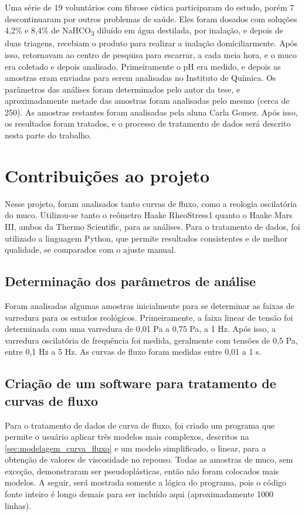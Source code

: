	Uma série de 19 voluntários com fibrose cística participaram do estudo, porém 7 descontinuaram por outros problemas de saúde. Eles foram dosados com soluções 4,2\% e 8,4\% de NaHCO\textsubscript{3} diluído em água destilada, por inalação, e depois de duas triagens, recebiam o produto para realizar a inalação domiciliarmente. Após isso, retornavam ao centro de pesquisa para escarrar, a cada meia hora, e o muco era coletado e depois analisado. Primeiramente o pH era medido, e depois as amostras eram enviadas para serem analisadas no Instituto de Química. Os parâmetros das análises foram determinados pelo autor da tese, e aproximadamente metade das amostras foram analisadas pelo mesmo (cerca de 250). As amostras restantes foram analisadas pela aluna Carla Gomez. Após isso, os resultados foram tratados, e o processo de tratamento de dados será descrito nesta parte do trabalho.


	\chapter{Contribuições ao projeto}
	
	Nesse projeto, foram analisados tanto curvas de fluxo, como a reologia oscilatória do muco. Utilizou-se tanto o reômetro Haake RheoStress1 quanto o Haake Mars III, ambos da Thermo Scientific, para as análises. Para o tratamento de dados, foi utilizado a linguagem Python, que permite resultados consistentes e de melhor qualidade, se comparados com o ajuste manual.
	
		\section{Determinação dos parâmetros de análise}
		
		Foram analisadas algumas amostras inicialmente para se determinar as faixas de varredura para os estudos reológicos. Primeiramente, a faixa linear de tensão foi determinada com uma varredura de 0,01 Pa a 0,75 Pa, a 1 Hz. Após isso, a varredura oscilatória de frequência foi medida, geralmente com tensões de 0,5 Pa, entre 0,1 Hz a 5 Hz. As curvas de fluxo foram medidas entre 0,01 a 1 s\menosUm.
	
		\section{Criação de um software para tratamento de curvas de fluxo} 
		\label{sec:apn_tratamento_CF}
		Para o tratamento de dados de curva de fluxo, foi criado um programa que permite o usuário aplicar três modelos mais complexos, descritos na \autoref{sec:modelagem_curva_fluxo} e um modelo simplificado, o linear, para a obtenção de valores de viscosidade no repouso. Todas as amostras de muco, sem exceção, demonstraram ser pseudoplásticas, então não foram colocados mais modelos. A seguir, será mostrada somente a lógica do programa, pois o código fonte inteiro é longo demais para ser incluído aqui (aproximadamente 1000 linhas).
		
